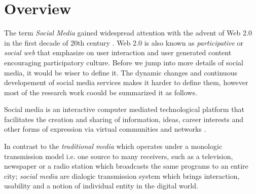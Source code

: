 \section*{Overview}
\label{sec:overview}
The term {\em Social Media} gained widespread attention with the advent of Web 2.0 in the first decade of 20th century \cite{kaplan2010users}. Web 2.0 is also known as {\em participative} or {\em social web} that emphasize on user interaction and user generated content encouraging participatory culture. Before we jump into more details of social media, it would be wiser to define it.
The dynamic changes and continuous developement of social media services makes it harder to define them, however most of the research work coould be summarized it as follows.

\begin{definition}
Social media is an interactive computer mediated technological platform that facilitates the creation and sharing of information, ideas, career interests and other forms of expression via virtual communities and networks \cite{kietzmann2011social}.
\end{definition}

In contrast to the {\em traditional media} which operates under a monologic transmission model i.e. one source to many receivers, such as a television, newspaper  or a radio station which broadcasts the same programs to an entire city; {\em social media} are dialogic transmission system which brings interaction, usability and a notion of individual entity in the digital world.




